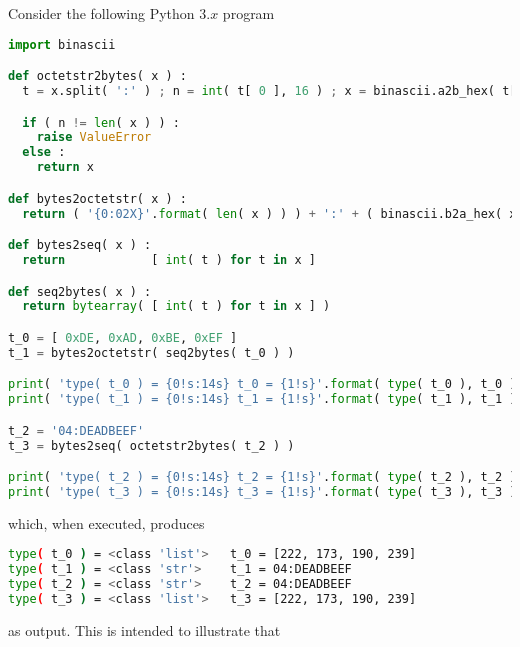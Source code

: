 Consider the following Python $3.x$ program

\begin{lstlisting}[language={Python}]
import binascii

def octetstr2bytes( x ) :
  t = x.split( ':' ) ; n = int( t[ 0 ], 16 ) ; x = binascii.a2b_hex( t[ 1 ] )

  if ( n != len( x ) ) :
    raise ValueError
  else :
    return x

def bytes2octetstr( x ) :
  return ( '{0:02X}'.format( len( x ) ) ) + ':' + ( binascii.b2a_hex( x ).decode( 'ascii' ).upper() )

def bytes2seq( x ) :
  return            [ int( t ) for t in x ]

def seq2bytes( x ) :
  return bytearray( [ int( t ) for t in x ] )

t_0 = [ 0xDE, 0xAD, 0xBE, 0xEF ]
t_1 = bytes2octetstr( seq2bytes( t_0 ) )

print( 'type( t_0 ) = {0!s:14s} t_0 = {1!s}'.format( type( t_0 ), t_0 ) )
print( 'type( t_1 ) = {0!s:14s} t_1 = {1!s}'.format( type( t_1 ), t_1 ) )

t_2 = '04:DEADBEEF'
t_3 = bytes2seq( octetstr2bytes( t_2 ) )

print( 'type( t_2 ) = {0!s:14s} t_2 = {1!s}'.format( type( t_2 ), t_2 ) )
print( 'type( t_3 ) = {0!s:14s} t_3 = {1!s}'.format( type( t_3 ), t_3 ) )
\end{lstlisting}

\noindent
which, when executed, produces

\begin{lstlisting}[language={bash}]
type( t_0 ) = <class 'list'>   t_0 = [222, 173, 190, 239]
type( t_1 ) = <class 'str'>    t_1 = 04:DEADBEEF
type( t_2 ) = <class 'str'>    t_2 = 04:DEADBEEF
type( t_3 ) = <class 'list'>   t_3 = [222, 173, 190, 239]
\end{lstlisting}

\noindent
as output.  This is intended to illustrate that

